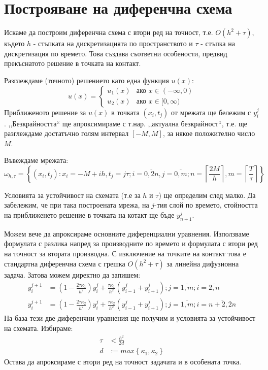 \section{Построяване на диференчна схема}
Искаме да построим диференчна схема с втори ред на точност, т.е. $O(h^2 + \tau)$, където $h$ - стъпката на дискретизацията по пространството и $\tau$  - стъпка на дискретизация по времето.
Това създава съответни особености, предвид прекъснатото решение в точката на контакт.

\noindent Разглеждаме (точното) решението като една функция $u(x)$:
\begin{equation}
    u(x)=
        \begin{cases}
            u_1(x) & \text{ако } x \in (-\infty, 0)\\
            u_2(x) & \text{ако } x \in [0, \infty)
        \end{cases}
\end{equation}
Приближеното решение за $u(x)$ в точката $(x_i, t_j)$ от мрежата ще бележим с $y_{i}^{j}$. ,,Безкрайността`` ще апроксимираме с т.нар. ,,актуална безкрайност``, т.е. ще разглеждаме достатъчно голям интервал $[-M, M]$, за някое положително число $M$.

\noindent Въвеждаме мрежата:
\begin{equation*}
    \omega_{h, \tau } = \left\{ (x_i, t_j):  x_i = -M + i h, t_j = j \tau; i = \overline{0,2n}, j = \overline{0,m};  n = \left\lceil \frac{2M}{h} \right\rceil, m =\left\lceil \frac{T}{\tau} \right\rceil \right\}
\end{equation*}

\noindent Условията за устойчивост на схемата (т.е за $h$ и $\tau$) ще определим след малко.
Да забележим, че при така построената мрежа, на $j$-тия слой по времето, стойността на приближенето решение в точката на котакт ще бъде $y_{n+1}^j$.

Можем вече да апроксираме основните диференциални уравнения. Използваме формулата с разлика напред за производните по времето и формулата с втори ред на точност за втората производна.
С изключение на точките на контакт това е стандартна диференчна схема с грешка $O(h^2+\tau)$ за линейна дифузионна задача. Затова можем директно да запишем:
\begin{align}
    y_{i}^{j+1} &= \left(1-\frac{2 \tau \kappa_1}{h^2}\right)y_{i}^j + \frac{\tau \kappa_1}{h^2}\left(y_{i-1}^j + y_{i+1}^j\right); j = \overline{1, m}; i  = \overline{2, n} \\
    y_{i}^{j+1} &= \left(1-\frac{2 \tau \kappa_2}{h^2}\right)y_{i}^j + \frac{\tau \kappa_2}{h^2}\left(y_{i-1}^j + y_{i+1}^j\right); j = \overline{1, m}; i  = \overline{n+2, 2n}
\end{align}
На база тези две диференчни уравнения ще получим и условията за устойчивост на схемата. Избираме:
\begin{align*}
    \tau &< \frac{h^2}{2 d}\\
    d &:= max \left\{\kappa_1, \kappa_2 \right\}
\end{align*}
Остава да апроксираме с втори ред на точност задачата и в особената точка.